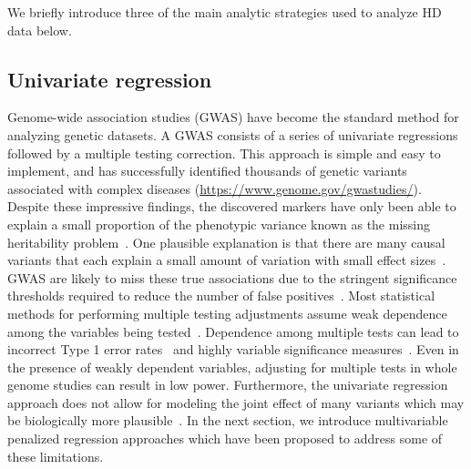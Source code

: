 We briefly introduce three of the main analytic strategies used to analyze HD data below.


\subsection{Univariate regression} \label{sec:single}

Genome-wide association studies (GWAS) have become the standard method for analyzing genetic datasets. A GWAS consists of a series of univariate regressions followed by a multiple testing correction. 
This approach is simple and easy to implement, and has successfully identified thousands of genetic variants associated with complex diseases (\url{https://www.genome.gov/gwastudies/}). 
Despite these impressive findings, the discovered markers have only been able to explain a small proportion of the phenotypic variance known as the missing heritability problem~\citep{manolio2009finding}.
One plausible explanation is that there are many causal variants that each explain a small amount of variation with small effect sizes~\citep{yang2010common}.
GWAS are likely to miss these true associations due to the stringent significance thresholds required to reduce the number of false positives~\citep{manolio2009finding}.
Most statistical methods for performing multiple testing adjustments assume weak dependence among the variables being tested~\citep{leek2008general}. 
Dependence among multiple tests can lead to incorrect Type 1 error rates~\citep{lin2013test} and highly variable significance measures~\citep{leek2008general}. 
Even in the presence of weakly dependent variables, adjusting for multiple tests in whole genome studies can result in low power. 
Furthermore, the univariate regression approach does not allow for modeling the joint effect of many variants which may be biologically more plausible~\citep{schadt2009molecular}. 
In the next section, we introduce multivariable penalized regression approaches which have been proposed to address some of these limitations. 



